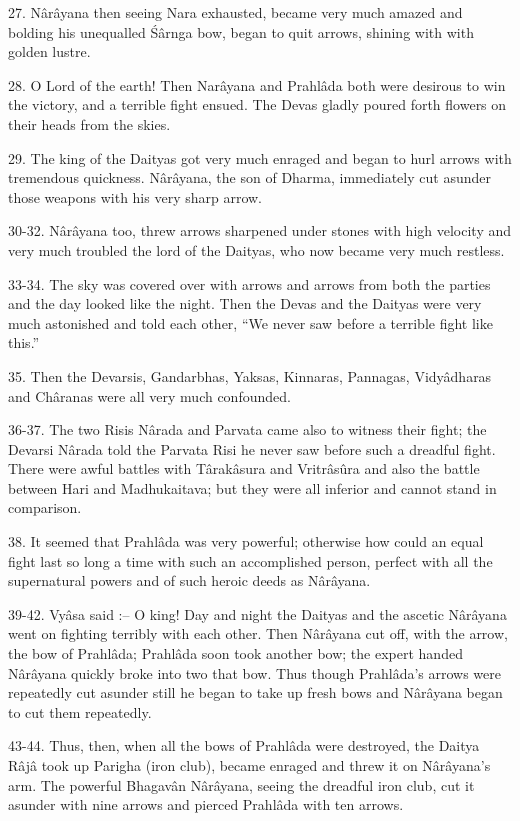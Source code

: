 27. N\^ar\^ayana then seeing Nara exhausted, became very much amazed and bolding his unequalled \'S\^arnga bow, began to quit arrows, shining with with golden lustre.

28. O Lord of the earth! Then Nar\^ayana and Prahl\^ada both were desirous to win the victory, and a terrible fight ensued. The Devas gladly poured forth flowers on their heads from the skies.

29. The king of the Daityas got very much enraged and began to hurl arrows with tremendous quickness. N\^ar\^ayana, the son of Dharma, immediately cut asunder those weapons with his very sharp arrow.

30-32. N\^ar\^ayana too, threw arrows sharpened under stones with high velocity and very much troubled the lord of the Daityas, who now became very much restless.

33-34. The sky was covered over with arrows and arrows from both the parties and the day looked like the night. Then the Devas and the Daityas were very much astonished and told each other, ``We never saw before a terrible fight like this.''

35. Then the Devarsis, Gandarbhas, Yaksas, Kinnaras, Pannagas, Vidy\^adharas and Ch\^aranas were all very much confounded.

36-37. The two Risis N\^arada and Parvata came also to witness their fight; the Devarsi N\^arada told the Parvata Risi he never saw before such a dreadful fight. There were awful battles with T\^arak\^asura and Vritr\^asûra and also the battle between Hari and Madhukaitava; but they were all inferior and cannot stand in comparison.

38. It seemed that Prahl\^ada was very powerful; otherwise how could an equal fight last so long a time with such an accomplished person, perfect with all the supernatural powers and of such heroic deeds as N\^ar\^ayana.

39-42. Vy\^asa said :-- O king! Day and night the Daityas and the ascetic N\^ar\^ayana went on fighting terribly with each other. Then N\^ar\^ayana cut off, with the arrow, the bow of Prahl\^ada; Prahl\^ada soon took another bow; the expert handed N\^ar\^ayana quickly broke into two that bow. Thus though Prahl\^ada's arrows were repeatedly cut asunder still he began to take up fresh bows and N\^ar\^ayana began to cut them repeatedly.

43-44. Thus, then, when all the bows of Prahl\^ada were destroyed, the Daitya R\^aj\^a took up Parigha (iron club), became enraged and threw it on N\^ar\^ayana's arm. The powerful Bhagav\^an N\^ar\^ayana, seeing the dreadful iron club, cut it asunder with nine arrows and pierced Prahl\^ada with ten arrows.

